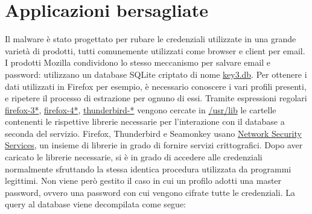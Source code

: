 \documentclass[12pt,oneside]{fithesis2}
\begin{document}
        \section*{Applicazioni bersagliate}
        
        Il malware è stato progettato per rubare le credenziali utilizzate in una grande varietà di prodotti, tutti comunemente utilizzati come browser e client per email. I prodotti Mozilla condividono lo stesso meccanismo per salvare email e password: utilizzano un database SQLite criptato di nome \url{key3.db}. Per ottenere i dati utilizzati in \newline Firefox per esempio, è necessario conoscere i vari profili presenti, e ripetere il processo di estrazione per ognuno di essi. Tramite espressioni regolari \url{firefox-3*}, \url{firefox-4*}, \url{thunderbird-*} vengono cercate in \url{/usr/lib} le cartelle contenenti le rispettive librerie necessarie per l'interazione con il database a seconda del servizio. Firefox, Thunderbird e Seamonkey usano \url{Network Security Services}, un insieme di librerie in grado di fornire servizi crittografici. Dopo aver caricato le librerie necessarie, si è in grado di accedere alle credenziali normalmente sfruttando la stessa identica procedura utilizzata da programmi legittimi. Non viene però gestito il caso in cui un profilo adotti una master password, ovvero una password con cui vengono cifrate tutte le credenziali. La query al database viene decompilata come segue:
        
\end{document}
